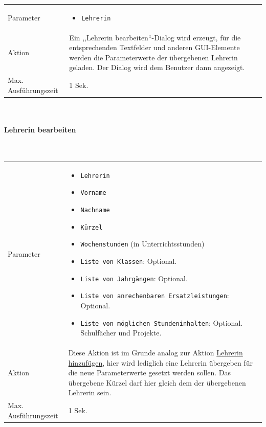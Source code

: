 \documentclass[fontsize=12pt,paper=a4,twoside]{scrartcl}
\begin{document}
\begin{tabularx}{\textwidth}{p{4cm}X}
Parameter & \begin{itemize}[itemsep=0pt, leftmargin = 0.5cm]
			\item \texttt{Lehrerin}
			\end{itemize}\\
Aktion & Ein ,,Lehrerin bearbeiten``-Dialog wird erzeugt, für die entsprechenden Textfelder und anderen GUI-Elemente werden die Parameterwerte der übergebenen Lehrerin geladen. Der Dialog wird dem Benutzer dann angezeigt.\\
Max. Ausführungszeit & 1 Sek.
\end{tabularx}\\

\paragraph{Lehrerin bearbeiten}\mbox{}\\

\begin{tabularx}{\textwidth}{p{4cm}X}
Parameter & \begin{itemize}[itemsep=0pt, leftmargin = 0.5cm]
			\item \texttt{Lehrerin}
			\item \texttt{Vorname}
			\item \texttt{Nachname}
			\item \texttt{Kürzel}
			\item \texttt{Wochenstunden} (in Unterrichtsstunden)
			\item \texttt{Liste von Klassen}: Optional. 
			\item \texttt{Liste von Jahrgängen}: Optional. 
			\item \texttt{Liste von anrechenbaren Ersatzleistungen}: Optional.
			\item \texttt{Liste von möglichen Stundeninhalten}: Optional. Schulfächer und Projekte.
			\end{itemize}\\
Aktion & Diese Aktion ist im Grunde analog zur Aktion \hyperlink{par:LehrerinHinzufuegen}{Lehrerin hinzufügen}, hier wird lediglich eine Lehrerin übergeben für die neue Parameterwerte gesetzt werden sollen. Das übergebene Kürzel darf hier gleich dem der übergebenen Lehrerin sein.\\
Max. Ausführungszeit & 1 Sek.
\end{tabularx}\\
\end{document}
